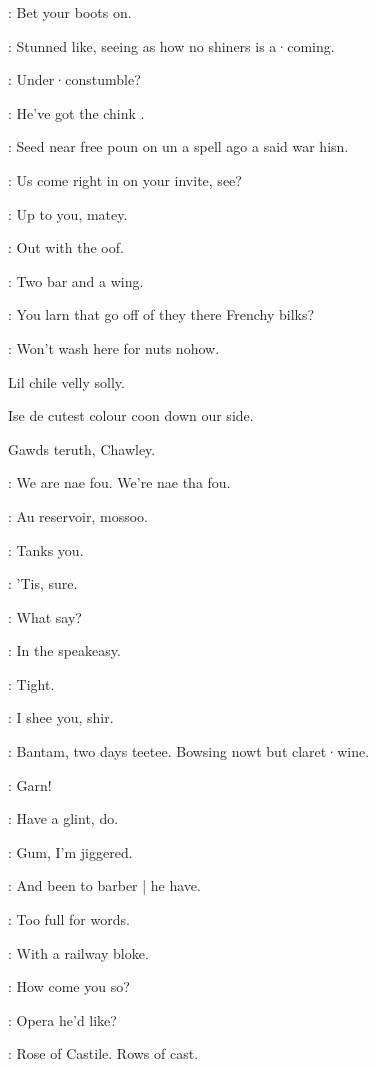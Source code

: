 \lynch:
Bet your boots on.

\bannon:
Stunned like,
seeing as how no shiners is a·coming.

\dixon:
Under·constumble?

\mulligan:
He've got the chink .

\crotthers:
Seed near free poun on un a spell ago a said war hisn.

\punch:
Us come right in on your invite,
see?

\bystander:
Up to you,
matey.

\mulligan:
Out with the oof.

\lenehan:
Two bar and a wing.

\dixon:
You larn that go off of they there Frenchy bilks?

\madden:
Won't wash here for nuts nohow.

\begin{omitted}
Lil chile velly solly.

Ise de cutest colour coon down our side.

Gawds teruth,
Chawley.
\end{omitted}

\crotthers:
We are nae fou.
We're nae tha fou.

\dixon:
Au reservoir,
mossoo.

\lynch:
Tanks you.


\lenehan:
'Tis,
sure.

\punch:
What say?

\lynch:
In the speakeasy.

\Bloom:
Tight.

\bannon:
I shee you,
shir.

\lenehan:
Bantam,
two days teetee.
Bowsing nowt but claret·wine.

\punch:
Garn!

\mulligan:
Have a glint,
do.

\madden:
Gum,
I'm jiggered.

\lenehan:
And been to barber |
he have.

\mulligan:
Too full for words.

\punch:
With a railway bloke.

\crotthers:
How come you so?

\dixon:
Opera he'd like?

\madden:
Rose of Castile.
Rows of cast.

